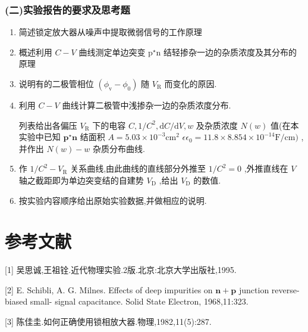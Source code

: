 \documentclass[12pt,a4paper]{article}
\begin{document}
\subsubsection*{(二)实验报告的要求及思考题}
\begin{enumerate}
    \item 简述锁定放大器从噪声中提取微弱信号的工作原理
    \item 概述利用 \(C - V\) 曲线测定单边突变 \(\mathrm{p}^{\star}\mathrm{n}\) 结轻掺杂一边的杂质浓度及其分布的原理
    \item 说明有的二极管相位 \((\phi_{\mathrm{v}} - \phi_{0})\) 随 \(V_{\mathrm{R}}\) 而变化的原因.
    \item 利用 \(C - V\) 曲线计算二极管中浅掺杂一边的杂质浓度分布.

    列表给出各偏压 \(V_{\mathrm{R}}\) 下的电容 \(C,1 / C^{2},\mathrm{d}C / \mathrm{d}V,w\) 及杂质浓度 \(N(w)\) 值(在本实验中已知 \(\mathbf{p}^{\star}\mathbf{n}\) 结面积 \(A = 5.03\times 10^{- 3}\mathrm{cm}^{2}\) \(\epsilon \epsilon_{0} = 11.8\times 8.854\times 10^{- 14}\mathrm{F / cm})\) ,并作出 \(N(w) - w\) 杂质分布曲线.

    \item 作 \(1 / C^{2} - V_{\mathrm{R}}\) 关系曲线,由此曲线的直线部分外推至 \(1 / C^{2} = 0\) ,外推直线在 \(V\) 轴之截距即为单边突变结的自建势 \(V_{\mathrm{D}}\) ,给出 \(V_{\mathrm{D}}\) 的数值.
    \item 按实验内容顺序给出原始实验数据,并做相应的说明.
\end{enumerate}

\section*{参考文献}

[1] 吴思诚,王祖铨.近代物理实验.2版.北京:北京大学出版社,1995.

[2] E. Schibli, A. G. Milnes. Effects of deep impurities on \(\mathbf{n} + \mathbf{p}\) junction reverse- biased small- signal capacitance. Solid State Electron, 1968,11:323.

[3] 陈佳圭.如何正确使用锁相放大器.物理,1982,11(5):287.
\end{document}
